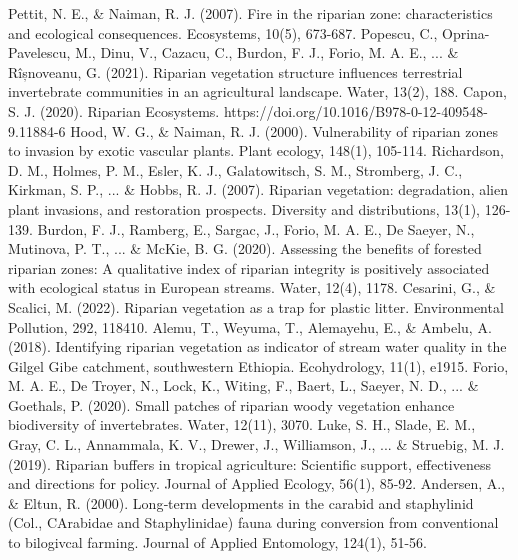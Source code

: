 \documentclass[12pt]{article}
\numberwithin{equation}{section}
\begin{document}
\begin{thebibliography}{99}
  Pettit, N. E., \& Naiman, R. J. (2007). Fire in the riparian zone: characteristics and ecological consequences. Ecosystems, 10(5), 673-687.
  Popescu, C., Oprina-Pavelescu, M., Dinu, V., Cazacu, C., Burdon, F. J., Forio, M. A. E., ... \& Rîșnoveanu, G. (2021). Riparian vegetation structure influences terrestrial invertebrate communities in an agricultural landscape. Water, 13(2), 188.
  Capon, S. J. (2020). Riparian Ecosystems. https://doi.org/10.1016/B978-0-12-409548-9.11884-6
  Hood, W. G., \& Naiman, R. J. (2000). Vulnerability of riparian zones to invasion by exotic vascular plants. Plant ecology, 148(1), 105-114.
  Richardson, D. M., Holmes, P. M., Esler, K. J., Galatowitsch, S. M., Stromberg, J. C., Kirkman, S. P., ... \& Hobbs, R. J. (2007). Riparian vegetation: degradation, alien plant invasions, and restoration prospects. Diversity and distributions, 13(1), 126-139.
  Burdon, F. J., Ramberg, E., Sargac, J., Forio, M. A. E., De Saeyer, N., Mutinova, P. T., ... \& McKie, B. G. (2020). Assessing the benefits of forested riparian zones: A qualitative index of riparian integrity is positively associated with ecological status in European streams. Water, 12(4), 1178.
  Cesarini, G., \& Scalici, M. (2022). Riparian vegetation as a trap for plastic litter. Environmental Pollution, 292, 118410.
  Alemu, T., Weyuma, T., Alemayehu, E., \& Ambelu, A. (2018). Identifying riparian vegetation as indicator of stream water quality in the Gilgel Gibe catchment, southwestern Ethiopia. Ecohydrology, 11(1), e1915.
  Forio, M. A. E., De Troyer, N., Lock, K., Witing, F., Baert, L., Saeyer, N. D., ... \& Goethals, P. (2020). Small patches of riparian woody vegetation enhance biodiversity of invertebrates. Water, 12(11), 3070.
  Luke, S. H., Slade, E. M., Gray, C. L., Annammala, K. V., Drewer, J., Williamson, J., ... \& Struebig, M. J. (2019). Riparian buffers in tropical agriculture: Scientific support, effectiveness and directions for policy. Journal of Applied Ecology, 56(1), 85-92.
  Andersen, A., \& Eltun, R. (2000). Long‐term developments in the carabid and staphylinid (Col., CArabidae and Staphylinidae) fauna during conversion from conventional to bilogivcal farming. Journal of Applied Entomology, 124(1), 51-56.

\end{thebibliography}
\end{document}
